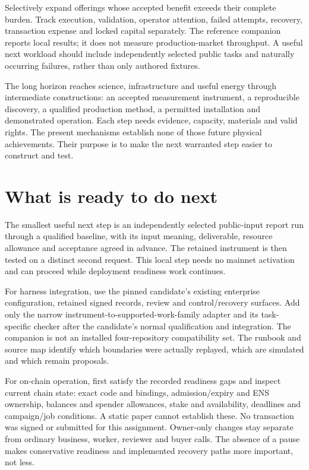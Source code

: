 \documentclass[11pt,letterpaper]{article}
\begin{document}
Selectively expand offerings whose accepted benefit exceeds their complete burden. Track execution, validation, operator attention, failed attempts, recovery, transaction expense and locked capital separately. The reference companion reports local results; it does not measure production-market throughput. A useful next workload should include independently selected public tasks and naturally occurring failures, rather than only authored fixtures.

The long horizon reaches science, infrastructure and useful energy through intermediate constructions: an accepted measurement instrument, a reproducible discovery, a qualified production method, a permitted installation and demonstrated operation. Each step needs evidence, capacity, materials and valid rights. The present mechanisms establish none of those future physical achievements. Their purpose is to make the next warranted step easier to construct and test.

\section{What is ready to do next}
The smallest useful next step is an independently selected public-input report run through a qualified baseline, with its input meaning, deliverable, resource allowance and acceptance agreed in advance. The retained instrument is then tested on a distinct second request. This local step needs no mainnet activation and can proceed while deployment readiness work continues.

For harness integration, use the pinned candidate's existing enterprise configuration, retained signed records, review and control/recovery surfaces. Add only the narrow instrument-to-supported-work-family adapter and its task-specific checker after the candidate's normal qualification and integration. The companion is not an installed four-repository compatibility set. The runbook and source map identify which boundaries were actually replayed, which are simulated and which remain proposals.

For on-chain operation, first satisfy the recorded readiness gaps and inspect current chain state: exact code and bindings, admission/expiry and ENS ownership, balances and spender allowances, stake and availability, deadlines and campaign/job conditions. A static paper cannot establish these. No transaction was signed or submitted for this assignment. Owner-only changes stay separate from ordinary business, worker, reviewer and buyer calls. The absence of a pause makes conservative readiness and implemented recovery paths more important, not less.
\end{document}
